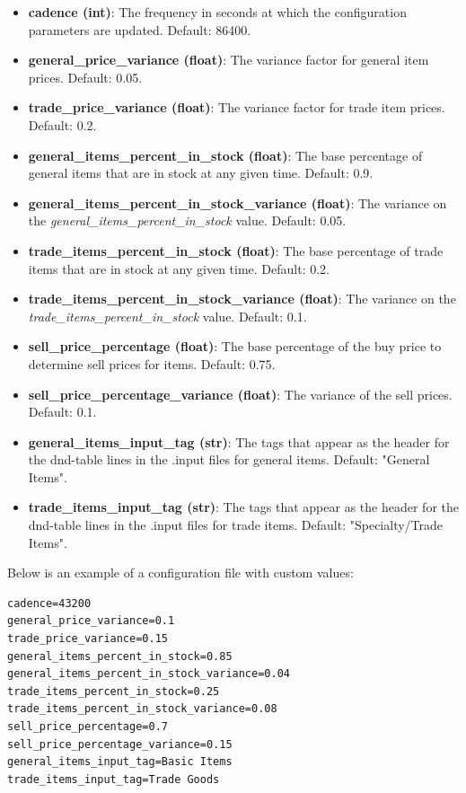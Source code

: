 \begin{itemize}
    \item \textbf{cadence (int)}: The frequency in seconds at which the configuration parameters are updated. Default: 86400.
    \item \textbf{general\_price\_variance (float)}: The variance factor for general item prices. Default: 0.05.
    \item \textbf{trade\_price\_variance (float)}: The variance factor for trade item prices. Default: 0.2.
    \item \textbf{general\_items\_percent\_in\_stock (float)}: The base percentage of general items that are in stock at any given time. Default: 0.9.
    \item \textbf{general\_items\_percent\_in\_stock\_variance (float)}: The variance on the \textit{general\_items\_percent\_in\_stock} value. Default: 0.05.
    \item \textbf{trade\_items\_percent\_in\_stock (float)}: The base percentage of trade items that are in stock at any given time. Default: 0.2.
    \item \textbf{trade\_items\_percent\_in\_stock\_variance (float)}: The variance on the \textit{trade\_items\_percent\_in\_stock} value. Default: 0.1.
    \item \textbf{sell\_price\_percentage (float)}: The base percentage of the buy price to determine sell prices for items. Default: 0.75.
    \item \textbf{sell\_price\_percentage\_variance (float)}: The variance of the sell prices. Default: 0.1.
    \item \textbf{general\_items\_input\_tag (str)}: The tags that appear as the header for the dnd-table lines in the .input files for general items. Default: "General Items".
    \item \textbf{trade\_items\_input\_tag (str)}: The tags that appear as the header for the dnd-table lines in the .input files for trade items. Default: "Specialty/Trade Items".
\end{itemize}

Below is an example of a configuration file with custom values:

\begin{lstlisting}
cadence=43200
general_price_variance=0.1
trade_price_variance=0.15
general_items_percent_in_stock=0.85
general_items_percent_in_stock_variance=0.04
trade_items_percent_in_stock=0.25
trade_items_percent_in_stock_variance=0.08
sell_price_percentage=0.7
sell_price_percentage_variance=0.15
general_items_input_tag=Basic Items
trade_items_input_tag=Trade Goods
\end{lstlisting}

